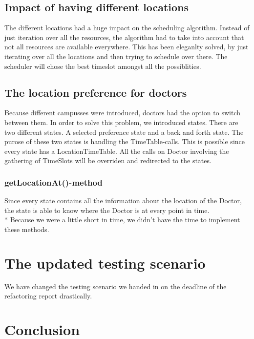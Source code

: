 \documentclass[12pt]{article}
\begin{document}
\subsection{Impact of having different locations}
The different locations had a huge impact on the scheduling algorithm. Instead of just iteration over all the resources, the algorithm had to take into account that not all resources are available everywhere. This has been eleganlty solved, by just iterating over all the locations and then trying to schedule over there. The scheduler will chose the best timeslot amongst all the possiblities.
\subsection{The location preference for doctors}
Because different campusses were introduced, doctors had the option to switch between them. In order to solve this problem, we introduced states. There are two different states. A selected preference state and a back and forth state. The purose of these two states is handling the TimeTable-calls. This is possible since every state has a LocationTimeTable. All the calls on Doctor involving the gathering of TimeSlots will be overriden and redirected to the states.
\subsubsection{getLocationAt()-method}
Since every state contains all the information about the location of the Doctor, the state is able to know where the Doctor is at every point in time.\\*
Because we were a little short in time, we didn't have the time to implement these methods.

\section{The updated testing scenario}
We have changed the testing scenario we handed in on the deadline of the refactoring report drastically.
\section{Conclusion}
\end{document}

